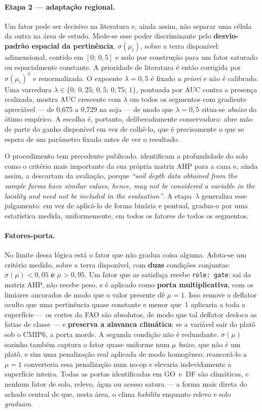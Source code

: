 \paragraph{Etapa 2 --- adaptação regional.}
Um fator pode ser decisivo na literatura e, ainda assim, não separar uma célula da outra na área de
estudo. Mede-se esse poder discriminante pelo \textbf{desvio-padrão espacial da pertinência},
$\sigma(\mu_i)$, sobre a terra disponível: adimensional, contido em $[0;\,0{,}5]$ e nulo por
construção para um fator saturado ou espacialmente constante. A prioridade de literatura é então
corrigida por $\sigma(\mu_i)^{\lambda}$ e renormalizada. O expoente $\lambda = 0{,}5$ é fixado
\emph{a priori} e não é calibrado. Uma varredura $\lambda \in \{0;\,0{,}25;\,0{,}5;\,0{,}75;\,1\}$, pontuada por AUC contra
a presença realizada, mostra AUC crescente com $\lambda$ em todos os segmentos com gradiente
apreciável --- de 0,675 a 0,729 na soja --- de modo que $\lambda = 0{,}5$ situa-se \emph{abaixo} do
ótimo empírico. A escolha é, portanto, deliberadamente conservadora: abre mão de parte do ganho
disponível em vez de colhê-lo, que é precisamente o que se espera de um parâmetro fixado antes de
ver o resultado.

O procedimento tem precedente publicado. \citet[p.~155]{alburo_application_2019} identificam a
profundidade do solo como o critério mais importante da sua própria matriz AHP para a cana e, ainda
assim, a descartam da avaliação, porque \emph{``soil depth data obtained from the sample farms have
similar values, hence, may not be considered a variable in the locality and need not be included in
the evaluation''}. A etapa~$\lambda$ generaliza esse julgamento: em vez de aplicá-lo de forma
binária e pontual, gradua-o por uma estatística medida, uniformemente, em todos os fatores de todos
os segmentos.

\paragraph{Fatores-porta.}
No limite dessa lógica está o fator que não gradua coisa alguma. Adota-se um critério medido, sobre
a terra disponível, com \textbf{duas} condições conjuntas:
$\sigma(\mu) < 0{,}05$ \textbf{e} $\overline{\mu} > 0{,}95$. Um fator que as satisfaça recebe
\texttt{role: gate}: sai da matriz AHP, não recebe peso, e é aplicado como \textbf{porta
multiplicativa}, com os limiares ancorados de modo que o valor presente dê $\mu = 1$. Isso remove o
deflator oculto que uma pertinência quase constante e menor que~1 aplicaria a toda a superfície
--- os cortes da FAO são absolutos, de modo que tal deflator desloca as fatias de classe --- e
\textbf{preserva a alavanca climática}: se a variável sair do platô sob o CMIP6, a porta morde.
A segunda condição não é redundante. $\sigma(\mu)$ sozinho também captura o fator quase uniforme num
$\mu$ \emph{baixo}, que não é um platô, e sim uma penalização real aplicada de modo homogêneo;
reancorá-lo a $\mu = 1$ converteria essa penalização num no-op e elevaria indevidamente a superfície
inteira. Todas as portas identificadas em GO~e~DF são climáticas, e nenhum fator de solo, relevo,
água ou acesso satura --- a forma mais direta do achado central de que, nesta área, o clima
\emph{habilita} enquanto relevo e solo \emph{graduam}.

